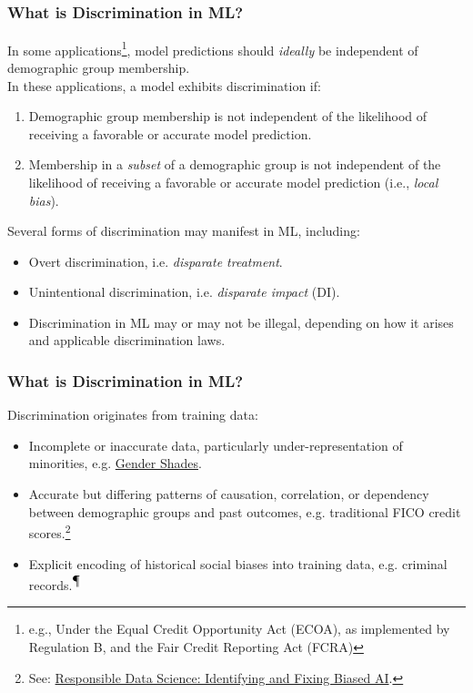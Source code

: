 \documentclass[11pt,
               		aspectratio=169,
               		hyperref={colorlinks}
               		]{beamer}
\begin{document}
		\subsection*{}
		\begin{frame}				
			\frametitle{What is Discrimination in ML?}
			\scriptsize			
			\noindent In some applications\footnote{\tiny{e.g., Under the Equal Credit Opportunity Act (ECOA), as implemented by Regulation B, and the Fair Credit Reporting Act (FCRA})}, model predictions should \textit{ideally} be independent of demographic group membership.\\
			\vspace{5pt}
			\noindent In these applications, a model exhibits discrimination if:
			\begin{enumerate}
				\item Demographic group membership is not independent of the likelihood of receiving a favorable or accurate model prediction.
				\item Membership in a \textit{subset} of a demographic group is not independent of the likelihood of receiving a favorable or accurate model prediction (i.e., \textit{local bias}).\cite{hall2019guidelines}
			\end{enumerate}
			\noindent Several forms of discrimination may manifest in ML, including:
			\begin{itemize}
				\item Overt discrimination, i.e. \textit{disparate treatment}.
				\item Unintentional discrimination, i.e. \textit{disparate impact} (DI).
				\item Discrimination in ML may or may not be illegal, depending on how it arises and applicable discrimination laws.\cite{hall2019guidelines}
			\end{itemize}
		\end{frame}		
		\begin{frame}				
			\frametitle{What is Discrimination in ML?}
			\noindent Discrimination originates from training data:\\
			\begin{itemize}
				\item Incomplete or inaccurate data, particularly under-representation of minorities, e.g. \href{http://gendershades.org/}{Gender Shades}\cite{gender_shades}.
				\item Accurate but differing patterns of causation, correlation, or dependency between demographic groups and past outcomes, e.g. traditional FICO credit scores.\footnote{\scriptsize{See: \href{https://www.youtube.com/watch?v=rToFuhI6Nlw}{Responsible Data Science: Identifying and Fixing Biased AI}.}}
				\item Explicit encoding of historical social biases into training data, e.g. criminal records.\textsuperscript{$\mathparagraph$}
			\end{itemize}
		\end{frame}
\end{document}
